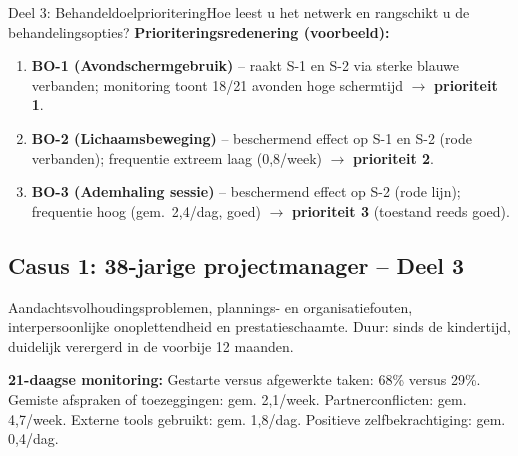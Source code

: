 \documentclass[11pt,a4paper]{article}
\begin{document}
\begin{voorbeeldbox}{Deel 3: Behandeldoelprioritering}{Hoe leest u het netwerk en rangschikt u de behandelingsopties?}
\medskip
\textbf{Prioriteringsredenering (voorbeeld):}
\begin{enumerate}[topsep=2pt,itemsep=1pt,label=\arabic*.]
\item \textbf{BO-1 (Avondschermgebruik)} -- raakt S-1 en S-2 via sterke blauwe verbanden;
monitoring toont 18/21 avonden hoge schermtijd $\rightarrow$ \textbf{prioriteit 1}.
\item \textbf{BO-2 (Lichaamsbeweging)} -- beschermend effect op S-1 en S-2 (rode verbanden);
frequentie extreem laag (0,8/week) $\rightarrow$ \textbf{prioriteit 2}.
\item \textbf{BO-3 (Ademhaling sessie)} -- beschermend effect op S-2 (rode lijn);
frequentie hoog (gem.\ 2,4/dag, goed) $\rightarrow$ \textbf{prioriteit 3} (toestand reeds goed).
\end{enumerate}
\end{voorbeeldbox}

\vspace{0.5em}

\newpage
\subsection*{Casus 1: 38-jarige projectmanager -- Deel 3}

\begin{complaintbox}[title={Casus 1: 38-jarige projectmanager}]
\small Aandachtsvolhoudingsproblemen, plannings- en organisatiefouten, interpersoonlijke onoplettendheid en prestatieschaamte. Duur: sinds de kindertijd, duidelijk verergerd in de voorbije 12 maanden.
\end{complaintbox}

\begin{monitorbox}
\small\textbf{21-daagse monitoring:} Gestarte versus afgewerkte taken: 68\% versus 29\%. Gemiste afspraken of toezeggingen: gem. 2,1/week. Partnerconflicten: gem. 4,7/week. Externe tools gebruikt: gem. 1,8/dag. Positieve zelfbekrachtiging: gem. 0,4/dag.
\end{monitorbox}
\end{document}
